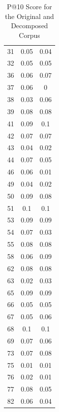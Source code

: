 \documentclass[11pt]{article} %
\begin{document}
\begin{table}[h]
\begin{center}
\begin{tabular}{c|c|c|}
            31  & 0.05              & 0.04 \\
            32  & 0.05              & 0.05 \\
            36  & 0.06              & 0.07 \\
            37  & 0.06              & 0    \\
            38  & 0.03              & 0.06 \\
            39  & 0.08              & 0.08 \\
            41  & 0.09              & 0.1  \\
            42  & 0.07              & 0.07 \\
            43  & 0.04              & 0.02 \\
            44  & 0.07              & 0.05 \\
            46  & 0.06              & 0.01 \\
            49  & 0.04              & 0.02 \\
            50  & 0.09              & 0.08 \\
            51  & 0.1               & 0.1  \\
            53  & 0.09              & 0.09 \\
            54  & 0.07              & 0.03 \\
            55  & 0.08              & 0.08 \\
            58  & 0.06              & 0.09 \\
            62  & 0.08              & 0.08 \\
            63  & 0.02              & 0.03 \\
            65  & 0.09              & 0.09 \\
            66  & 0.05              & 0.05 \\
            67  & 0.05              & 0.06 \\
            68  & 0.1               & 0.1  \\
            69  & 0.07              & 0.06 \\
            73  & 0.07              & 0.08 \\
            75  & 0.01              & 0.01 \\
            76  & 0.02              & 0.01 \\
            77  & 0.08              & 0.05 \\
            82  & 0.06              & 0.04 \\
        \end{tabular}
        \caption{P@10 Score for the Original and Decomposed Corpus}
    \end{center}
\end{table}
\end{document}
